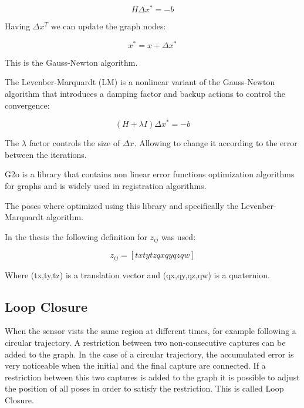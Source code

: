 \begin{equation}
H \Delta x^* = -b
\end{equation}

Having $\Delta x^T$ we can update the graph nodes:

\begin{equation}
x^* = x + \Delta x^* 
\end{equation}

This is the Gauss-Newton algorithm. 

The Levenber-Marquardt (LM) is a nonlinear variant of the Gauss-Newton algorithm that introduces a
damping factor and backup actions to control the convergence:

\begin{equation}
(H + \lambda I) \Delta x^* = -b
\end{equation}

The $\lambda$ factor controls the size of $ \Delta x$. Allowing to change it according to the error between the iterations.
 


G2o is a library that contains non linear error functions optimization 
algorithms for graphs and is widely used in registration algorithms. 

The poses where optimized using this library and specifically the 
Levenber-Marquardt algorithm.

In the thesis the following definition for $z_{ij}$ was used:

\begin{equation}
z_{ij} = [tx ty tz qx qy qz qw]
\end{equation}

Where (tx,ty,tz) is a translation vector and (qx,qy,qz,qw) is a quaternion.

\subsection{Loop Closure}

When the sensor vists the same region at different times, for example following 
a circular trajectory. A restriction between two non-consecutive captures can be 
added to the graph. In the case of a circular trajectory, the accumulated error 
is very noticeable when the initial and the final capture are connected. If a 
restriction between this two captures is added to the graph it is possible to 
adjust the position of all poses in order to satisfy the restriction. This 
is called Loop Closure.


